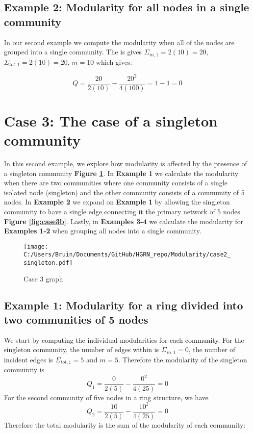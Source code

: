 \documentclass[a4paper,12pt]{article}
\begin{document}
	\subsection*{Example 2: Modularity for all nodes in a single community}
		In our second example we compute the modularity when all of the nodes are grouped into a single community. The is gives $\Sigma_{in,1} = 2(10) = 20$, $\Sigma_{tot,1} = 2(10) = 20$,  $m = 10$ which gives:
	
		\[ Q = \frac{20}{2(10)}-\frac{20^2}{4(100)} = 1-1 = 0 \]
	
	
	
	
	
	
	
	
	
	
	
	
	
	
	
	
	
	
	
	
	
	

	\section{Case 3: The case of a singleton community}
	In this second example, we explore how modularity is affected by the presence of a singleton community \textbf{Figure \ref{fig:case3}}. In \textbf{Example 1} we calculate the modularity when there are two communities where one community consists of a single isolated node (singleton) and the other community consists of a community of 5 nodes. In \textbf{Example 2} we expand on \textbf{Example 1} by allowing the singleton community to have a single edge connecting it the primary network of 5 nodes \textbf{Figure \ref{fig:case3b}}. Lastly, in \textbf{Examples 3-4} we calculate the modularity for \textbf{Examples 1-2} when grouping all nodes into a single community. 
	
	\begin{figure}[H]
		\centering
		\caption{Case 3 graph}
		\texttt{[image: C:/Users/Bruin/Documents/GitHub/HGRN\_repo/Modularity/case2\_singleton.pdf]}
		\label{fig:case3}
	\end{figure}
	
	\subsection*{Example 1: Modularity for a ring divided into two communities of 5 nodes}
	We start by computing the individual modularities for each community. For the singleton community, the number of edges within is $\Sigma_{in,1} = 0$, the number of incident edges is $\Sigma_{tot,1} = 5$ and $m = 5$. Therefore the modularity of the singleton community is 
	\[Q_1 = \frac{0}{2(5)} - \frac{0^2}{4(25)} = 0\]
	For the second community of five nodes in a ring structure, we have 
	\[Q_2 = \frac{10}{2(5)} - \frac{10^2}{4(25)} = 0\]
	Therefore the total modularity is the sum of the modularity of each community:
	
\end{document}
